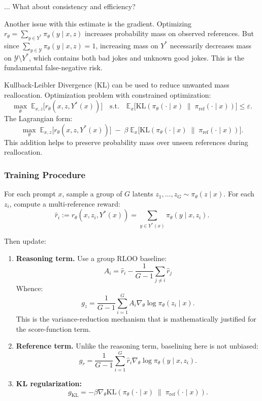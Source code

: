 \documentclass[12pt]{extarticle}
\begin{document}
... What about consistency and efficiency?

Another issue with this estimate is the gradient. Optimizing \(r_\theta=\sum_{y\in Y^{*}}\pi_\theta(y\mid x,z)\) increases probability mass on observed references. But since \(\sum_{y\in\mathcal{Y}}\pi_\theta(y\mid x,z)=1\), increasing mass on \(Y^{*}\) necessarily decreases mass on \(\mathcal{Y}\setminus Y^{*}\), which contains both bad jokes and unknown good jokes. This is the fundamental false-negative risk.

Kullback-Leibler Divergence (\(\mathrm{KL}\)) can be used to reduce unwanted mass reallocation. Optimization problem with constrained optimization:
\[
  \max_\theta\; \mathbb{E}_{x,z}\big[r_\theta(x,z,Y^{*}(x))\big]
  \quad\text{s.t.}\quad
  \mathbb{E}_{x}\big[\mathrm{KL}(\pi_\theta(\cdot\mid x)\;\|\;\pi_{\text{ref}}(\cdot\mid x))\big]\le \varepsilon.
\]
The Lagrangian form:
\[
  \max_\theta\; \mathbb{E}_{x,z}\big[r_\theta(x,z,Y^{*}(x))\big]
  \;-\;\beta\;\mathbb{E}_{x}\big[\mathrm{KL}(\pi_\theta(\cdot\mid x)\;\|\;\pi_{\text{ref}}(\cdot\mid x))\big].
\]
This addition helps to preserve probability mass over unseen references during reallocation.

\subsubsection{Training Procedure}
For each prompt \(x\), sample a group of \(G\) latents \(z_1,\dots,z_G\sim \pi_\theta(z\mid x)\). For each \(z_i\), compute a multi-reference reward:
\[
  \hat r_i := r_\theta(x,z_i,Y^{*}(x))=\sum_{y\in Y^{*}(x)}\pi_\theta(y\mid x,z_i).
\]

Then update:
\begin{enumerate}[leftmargin=1.8em]
  \item \textbf{Reasoning term.} Use a group RLOO baseline:
        \[
          A_i = \hat r_i - \frac{1}{G-1}\sum_{j\ne i}\hat r_j
        \]
        Whence:
        \[
          g_z = \frac{1}{G-1} \sum_{i=1}^G A_i \nabla_\theta \log \pi_\theta(z_i\mid x).
        \]
        This is the variance-reduction mechanism that is mathematically justified for the score-function term.

  \item \textbf{Reference term.} Unlike the reasoning term, baselining here is not unbiased:
        \[
          g_{r} = \frac{1}{G-1} \sum_{i=1}^G \hat r_i\nabla_\theta \log \pi_\theta(y\mid x,z_i).
        \]

  \item \textbf{KL regularization:}
        \[
          g_{\text{KL}} = -\beta\nabla_\theta \mathrm{KL}(\pi_\theta(\cdot\mid x)\;\|\;\pi_{\text{ref}}(\cdot\mid x)).
        \]
\end{enumerate}
\end{document}
